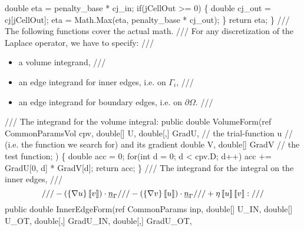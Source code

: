 {\btab \btab double eta          = penalty\_base * cj\_in;\newline 
\btab \btab if(jCellOut >= 0) \{\newline 
\btab \btab \btab double cj\_out = cj[jCellOut];\newline 
\btab \btab \btab eta           = Math.Max(eta, penalty\_base * cj\_out);\newline 
\btab \btab \}\newline 
\btab \btab return eta;\newline 
\btab \}\newline 
    /// The following functions cover the actual math.
    /// For any discretization of the Laplace operator, we have to specify:
    /// \begin{itemize}
    /// \item a volume integrand,
    /// \item an edge integrand for inner edges, i.e. on $\Gamma_i$,
    /// \item an edge integrand for boundary edges, i.e. on $\partial \Omega$.
    /// \end{itemize}
    /// The integrand for the volume integral:
\btab public double VolumeForm(ref CommonParamsVol cpv, \newline 
\btab \btab    double[] U, double[,] GradU, // the trial-function u \newline 
\btab \btab    //            (i.e. the function we search for) and its gradient\newline 
\btab \btab    double V, double[] GradV     // the test function; \newline 
\btab \btab    ) \{\newline 
 \newline 
\btab \btab double acc = 0;\newline 
\btab \btab for(int d = 0; d < cpv.D; d++)\newline 
\btab \btab \btab acc += GradU[0, d] * GradV[d];\newline 
\btab \btab return acc;\newline 
\btab \}\newline 
    /// The integrand for the integral on the inner edges,
    /// \[
    ///   -( \mean{ \nabla u } \jump{ v }) \cdot \vec{n}_{\Gamma} 
    ///   -( \mean{ \nabla v } \jump{ u }) \cdot \vec{n}_{\Gamma} 
    ///   + \eta \jump{ u }  \jump{v} :
    /// \]
\btab public double InnerEdgeForm(ref CommonParams inp, \newline 
\btab \btab double[] U\_IN, double[] U\_OT, double[,] GradU\_IN, double[,] GradU\_OT, \newline 
}
